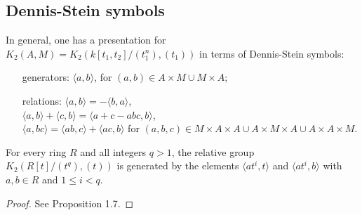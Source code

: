

\subsection{Dennis-Stein symbols}
\label{sub:dennis_stein_symbols}
In general, one has a presentation for $K_2(A,M)=K_2(k[t_1,t_2]/(t_1^n),(t_1))$ in terms of Dennis-Stein symbols:
\begin{itemize}
	\item[generators:]   $\langle a,b \rangle $, for $(a,b)\in A\times M \cup M \times A$;
	\item[relations:] $\langle a,b\rangle = -\langle b,a \rangle$, \\
	$\langle a,b\rangle +\langle c,b \rangle=\langle a+c-abc,b\rangle$, \\
	 $\langle a,bc\rangle =\langle ab,c\rangle +\langle ac,b\rangle$ for $(a,b,c)\in  M\times A\times A \cup A\times M \times A \cup A\times A\times M$.
\end{itemize}

\begin{prop}
	For every ring $R$ and all integers $q > 1$, the relative group $K_2(R[t]/(t^q),(t))$ is generated by the elements $\langle at^i,t\rangle$ and $\langle at^i,b\rangle$ with $a,b\in R$ and $ 1\leq i<q$. 
\end{prop}
\begin{proof}
	See \cite{MR82k:13016} Proposition 1.7. 
\end{proof}

